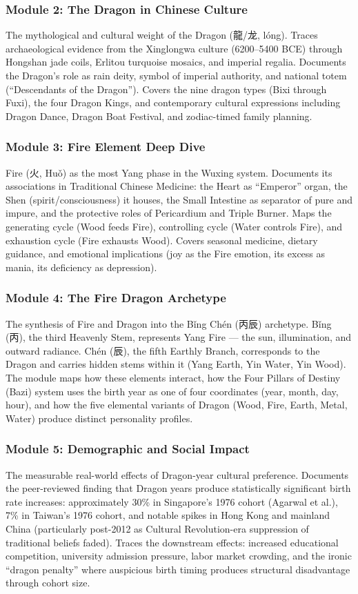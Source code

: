 \documentclass[11pt,letterpaper]{article}
\begin{document}
\subsubsection{Module 2: The Dragon in Chinese Culture}
The mythological and cultural weight of the Dragon (龍/龙, lóng). Traces archaeological evidence from the Xinglongwa culture (6200--5400 BCE) through Hongshan jade coils, Erlitou turquoise mosaics, and imperial regalia. Documents the Dragon's role as rain deity, symbol of imperial authority, and national totem (``Descendants of the Dragon''). Covers the nine dragon types (Bixi through Fuxi), the four Dragon Kings, and contemporary cultural expressions including Dragon Dance, Dragon Boat Festival, and zodiac-timed family planning.

\subsubsection{Module 3: Fire Element Deep Dive}
Fire (火, Huǒ) as the most Yang phase in the Wuxing system. Documents its associations in Traditional Chinese Medicine: the Heart as ``Emperor'' organ, the Shen (spirit/consciousness) it houses, the Small Intestine as separator of pure and impure, and the protective roles of Pericardium and Triple Burner. Maps the generating cycle (Wood feeds Fire), controlling cycle (Water controls Fire), and exhaustion cycle (Fire exhausts Wood). Covers seasonal medicine, dietary guidance, and emotional implications (joy as the Fire emotion, its excess as mania, its deficiency as depression).

\subsubsection{Module 4: The Fire Dragon Archetype}
The synthesis of Fire and Dragon into the Bǐng Chén (丙辰) archetype. Bǐng (丙), the third Heavenly Stem, represents Yang Fire --- the sun, illumination, and outward radiance. Chén (辰), the fifth Earthly Branch, corresponds to the Dragon and carries hidden stems within it (Yang Earth, Yin Water, Yin Wood). The module maps how these elements interact, how the Four Pillars of Destiny (Bazi) system uses the birth year as one of four coordinates (year, month, day, hour), and how the five elemental variants of Dragon (Wood, Fire, Earth, Metal, Water) produce distinct personality profiles.

\subsubsection{Module 5: Demographic and Social Impact}
The measurable real-world effects of Dragon-year cultural preference. Documents the peer-reviewed finding that Dragon years produce statistically significant birth rate increases: approximately 30\% in Singapore's 1976 cohort (Agarwal et al.), 7\% in Taiwan's 1976 cohort, and notable spikes in Hong Kong and mainland China (particularly post-2012 as Cultural Revolution-era suppression of traditional beliefs faded). Traces the downstream effects: increased educational competition, university admission pressure, labor market crowding, and the ironic ``dragon penalty'' where auspicious birth timing produces structural disadvantage through cohort size.
\end{document}
